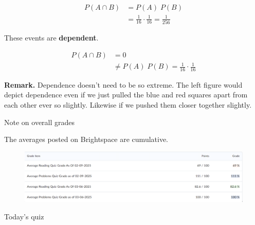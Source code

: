 \documentclass[10pt]{beamer}
\begin{document}
\begin{frame}
\begin{minipage}{.45\textwidth}
\begin{center}
\begin{align*}
P(A \cap B) &= P(A) \; P(B) \\
&= \frac{1}{16} \cdot \frac{1}{16}   = \frac{1}{256} 
\end{align*}
\end{center}
\end{minipage} %
\hfill 
\begin{minipage}{.45\textwidth}

These events are \textbf{dependent}.

\begin{align*}
P(A \cap B) &= 0  \\
& \neq  P(A) \; P(B) = \frac{1}{16} \cdot \frac{1}{16}
\end{align*}
\end{minipage} %
\vfill 
\pause 
\colorbox{orange!30}{\textbf{Remark.}} Dependence doesn't need to be so extreme. The left  figure would depict dependence even if we just pulled the blue and red squares apart from each other ever so slightly.  Likewise if we pushed them closer together slightly.
\end{frame}

\begin{frame}{Note on overall grades}

The averages posted on Brightspace are cumulative.
\vfill 
\begin{figure}
\includegraphics[width=\textwidth]{images/overall_grades}	
\end{figure}

\vfill 
	
\end{frame}


\begin{frame}[standout]
Today's quiz
\end{frame}
\end{document}
